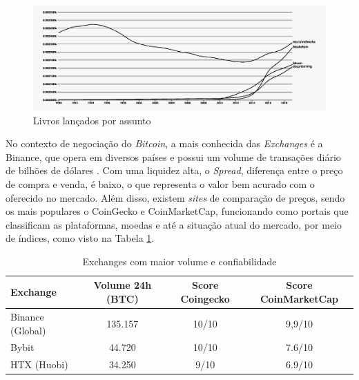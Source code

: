 \begin{figure}[!htb] \centering
    \caption{Livros lançados por assunto} \label{figura:imagengram}
    \begin{varwidth}{\linewidth}
      \includegraphics[width=15cm]{figuras/ngram.png}
    \end{varwidth}
  \end{figure}

No contexto de negociação do \textit{Bitcoin}, a mais conhecida das \textit{Exchanges} é a Binance, que opera em diversos países e possui um volume de transações diário de bilhões de dólares \cite{FakeExchanges}.
Com uma liquidez alta, o \textit{Spread}, diferença entre o preço de compra e venda, é baixo, o que representa o valor bem acurado com o oferecido no mercado.
Além disso, existem \textit{sites} de comparação de preços, sendo os mais populares o CoinGecko e CoinMarketCap, funcionando
como portais que classificam as plataformas, moedas e até a situação atual do mercado, por meio de índices, como visto na Tabela \ref{tabela:lista_produtos}.


\begin{table}[!htb]
  \caption{Exchanges com maior volume e confiabilidade} \label{tabela:lista_produtos}
  \begin{tabularx}{\textwidth}{l|c|c|c} \hline
    Exchange      & Volume 24h (BTC) & Score Coingecko & Score CoinMarketCap  \\ \hline
    Binance (Global)      & 135.157      & 10/10        & 9,9/10 \\
    Bybit         & 44.720      & 10/10        & 7.6/10  \\
    HTX (Huobi)       & 34.250     & 9/10        & 6.9/10  \\ \hline
  \end{tabularx}
\end{table}



